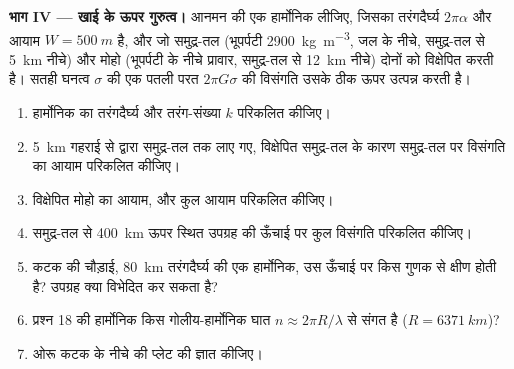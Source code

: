\begin{problem}
\noindent\textbf{भाग IV --- खाई के ऊपर गुरुत्व।} आनमन की एक हार्मोनिक लीजिए, जिसका
तरंगदैर्घ्य $2\pi\alpha$ और आयाम $W = \qty{500}{m}$ है, और जो
समुद्र-तल (भूपर्पटी \qty{2900}{kg.m^{-3}}, जल के नीचे, समुद्र-तल से \qty{5}{km} नीचे)
और मोहो (भूपर्पटी के नीचे प्रावार, समुद्र-तल से \qty{12}{km} नीचे) दोनों को विक्षेपित करती है।
सतही घनत्व $\sigma$ की एक पतली परत $2\pi G\sigma$ की विसंगति
उसके ठीक ऊपर उत्पन्न करती है।
\begin{enumerate}[resume]
  \item हार्मोनिक का तरंगदैर्घ्य और तरंग-संख्या $k$ परिकलित कीजिए।
  \item \qty{5}{km} गहराई से  द्वारा समुद्र-तल तक लाए गए,
        विक्षेपित समुद्र-तल के कारण समुद्र-तल पर विसंगति का आयाम परिकलित कीजिए।
  \item विक्षेपित मोहो का आयाम, और कुल आयाम परिकलित कीजिए।
  \item समुद्र-तल से \qty{400}{km} ऊपर स्थित उपग्रह की ऊँचाई पर कुल विसंगति
        परिकलित कीजिए।
  \item कटक की चौड़ाई, \qty{80}{km} तरंगदैर्घ्य की एक हार्मोनिक, उस ऊँचाई पर
        किस गुणक से क्षीण होती है? उपग्रह क्या विभेदित कर सकता है?
  \item प्रश्न 18 की हार्मोनिक किस गोलीय-हार्मोनिक घात $n \approx 2\pi R/\lambda$ से
        संगत है ($R = \qty{6371}{km}$)?
  \item ओरू कटक के नीचे की प्लेट की 
        ज्ञात कीजिए।
\end{enumerate}
\end{problem}
